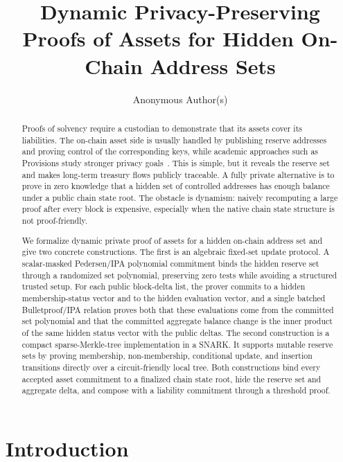 \documentclass[runningheads]{llncs}
\title{Dynamic Privacy-Preserving Proofs of Assets for Hidden On-Chain Address Sets}
\author{Anonymous Author(s)}
\institute{}
\begin{document}
\maketitle

\begin{abstract}
Proofs of solvency require a custodian to demonstrate that its assets cover its liabilities.  The on-chain asset side is usually handled by publishing reserve addresses and proving control of the corresponding keys, while academic approaches such as Provisions study stronger privacy goals~\cite{Provisions15}.  This is simple, but it reveals the reserve set and makes long-term treasury flows publicly traceable.  A fully private alternative is to prove in zero knowledge that a hidden set of controlled addresses has enough balance under a public chain state root.  The obstacle is dynamism: naively recomputing a large proof after every block is expensive, especially when the native chain state structure is not proof-friendly.

We formalize dynamic private proof of assets for a hidden on-chain address set and give two concrete constructions.  The first is an algebraic fixed-set update protocol.  A scalar-masked Pedersen/IPA polynomial commitment binds the hidden reserve set through a randomized set polynomial, preserving zero tests while avoiding a structured trusted setup.  For each public block-delta list, the prover commits to a hidden membership-status vector and to the hidden evaluation vector, and a single batched Bulletproof/IPA relation proves both that these evaluations come from the committed set polynomial and that the committed aggregate balance change is the inner product of the same hidden status vector with the public deltas.  The second construction is a compact sparse-Merkle-tree implementation in a SNARK.  It supports mutable reserve sets by proving membership, non-membership, conditional update, and insertion transitions directly over a circuit-friendly local tree.  Both constructions bind every accepted asset commitment to a finalized chain state root, hide the reserve set and aggregate delta, and compose with a liability commitment through a threshold proof.
\end{abstract}

\section{Introduction}
\end{document}
